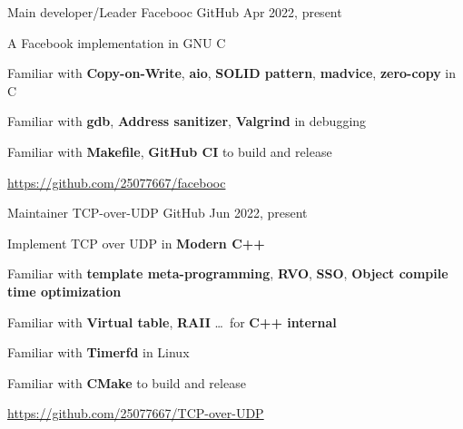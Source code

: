 

\begin{cventries}

    \cventry
    {Main developer/Leader}
    {Facebooc}
    {GitHub} %
    {Apr 2022, present} %
    {
        \begin{cvitems} %
            \item {A Facebook implementation in GNU C}
			\item {Familiar with \textbf{Copy-on-Write}, \textbf{aio}, \textbf{SOLID pattern}, \textbf{madvice}, \textbf{zero-copy} in C}
			\item {Familiar with \textbf{gdb}, \textbf{Address sanitizer}, \textbf{Valgrind} in debugging}
			\item {Familiar with \textbf{Makefile}, \textbf{GitHub CI} to build and release}
            \item {\url{https://github.com/25077667/facebooc}}
        \end{cvitems}
    }

    \cventry
    {Maintainer}
    {TCP-over-UDP}
    {GitHub} %
    {Jun 2022, present} %
    {
        \begin{cvitems} %
		    \item {Implement TCP over UDP in \textbf{Modern C++}}
			\item {Familiar with \textbf{template meta-programming}, \textbf{RVO}, \textbf{SSO}, \textbf{Object compile time optimization}}
			\item {Familiar with \textbf{Virtual table}, \textbf{RAII} \dots \ for \textbf{C++ internal}}
			\item {Familiar with \textbf{Timerfd} in Linux}
			\item {Familiar with \textbf{CMake} to build and release}
            \item {\url{https://github.com/25077667/TCP-over-UDP}}
        \end{cvitems}
    }
    

\end{cventries}
